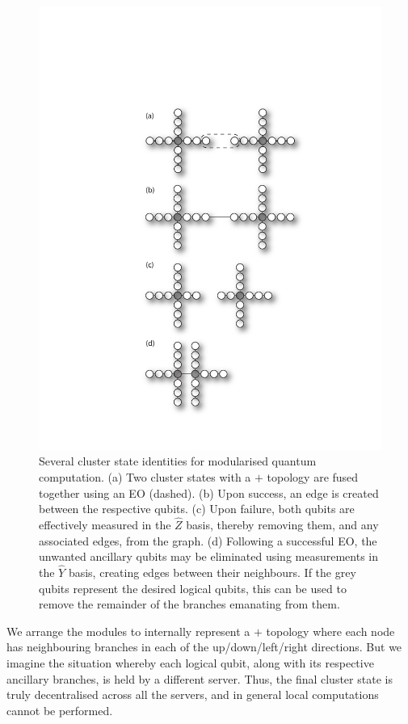 \documentclass[aps,rmp,twocolumn,amsmath,amssymb,nofootinbib,superscriptaddress]{revtex4}
\begin{document}
\begin{figure}[!htb]
\includegraphics[width=0.9\columnwidth]{cluster_ident}
\caption{Several cluster state identities for modularised quantum computation. (a) Two cluster states with a $+$ topology are fused together using an EO (dashed). (b) Upon success, an edge is created between the respective qubits. (c) Upon failure, both qubits are effectively measured in the $\hat{Z}$ basis, thereby removing them, and any associated edges, from the graph. (d) Following a successful EO, the unwanted ancillary qubits may be eliminated using measurements in the $\hat{Y}$ basis, creating edges between their neighbours. If the grey qubits represent the desired logical qubits, this can be used to remove the remainder of the branches emanating from them.} \label{fig:plus_cluster_ident}
\end{figure}

We arrange the modules to internally represent a $+$ topology where each node has neighbouring branches in each of the up/down/left/right directions. But we imagine the situation whereby each logical qubit, along with its respective ancillary branches, is held by a different server. Thus, the final cluster state is truly decentralised across all the servers, and in general local computations cannot be performed.
\end{document}

